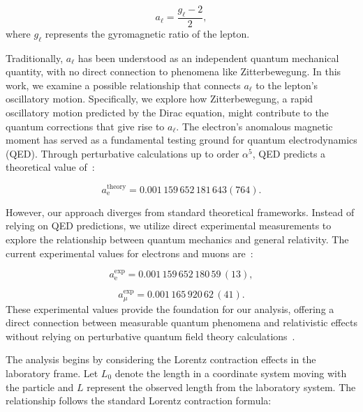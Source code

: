 \documentclass[%
 reprint,
 amsmath,amssymb,
 aps,
]{revtex4-1}
\numberwithin{equation}{section}%
\begin{document}
\begin{equation}
a_\ell = \frac{g_\ell - 2}{2},
\end{equation}
where $g_\ell$ represents the gyromagnetic ratio of the lepton. 

Traditionally, $a_\ell$ has been understood as an independent quantum mechanical quantity, with no direct connection to phenomena like Zitterbewegung. In this work, we examine a possible relationship that connects $a_\ell$ to the lepton's oscillatory motion. Specifically, we explore how Zitterbewegung, a rapid oscillatory motion predicted by the Dirac equation, might contribute to the quantum corrections that give rise to $a_\ell$. The electron's anomalous magnetic moment has served as a fundamental testing ground for quantum electrodynamics (QED). Through perturbative calculations up to order $\alpha^5$, QED predicts a theoretical value of~\cite{Aoyama2012,Aoyama2015,Nio2015}:

\begin{equation}
    a^{\text{theory}}_{\text{e}} = 0.001\,159\,652\,181\,643(764).
\end{equation}

However, our approach diverges from standard theoretical frameworks. Instead of relying on QED predictions, we utilize direct experimental measurements to explore the relationship between quantum mechanics and general relativity. The current experimental values for electrons and muons are~\cite{Fan2023, Bennett2006}:

\begin{equation}
   a^{\text{exp}}_{\text{e}} = 0.001\,159\,652\,180\,59\,(13),
   \label{eq:electron_moment}
\end{equation}

\begin{equation}
   a^{\text{exp}}_{\mu} = 0.001\,165\,920\,62\,(41).
   \label{eq:muon_moment}
\end{equation}
These experimental values provide the foundation for our analysis, offering a direct connection between measurable quantum phenomena and relativistic effects without relying on perturbative quantum field theory calculations~\cite{Hanneke2008}.

The analysis begins by considering the Lorentz contraction effects in the laboratory frame. Let $L_0$ denote the length in a coordinate system moving with the particle and $L$ represent the observed length from the laboratory system. The relationship follows the standard Lorentz contraction formula:
\end{document}
